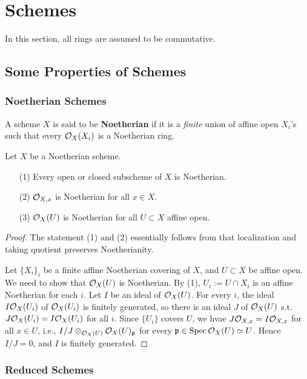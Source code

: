 \section{Schemes}
In this section, all rings are assumed to be commutative.

\subsection{Some Properties of Schemes}

\subsubsection{Noetherian Schemes}
A scheme $X$ is said to be \textbf{Noetherian} if it is a \textit{finite} union of affine open $X_i$'s such that every $\mathcal{O}_X(X_i)$ is a Noetherian ring.

\begin{proposition}
    Let $X$ be a Noetherian scheme.
\begin{enumerate}
\item [(1)] Every open or closed subscheme of $X$ is Noetherian.
\item [(2)] $\mathcal{O}_{X, x}$ is Noetherian for all $x\in X$.
\item [(3)] $\mathcal{O}_X(U)$ is Noetherian for all $U\subset X$ affine open.
\end{enumerate}
\end{proposition}
\begin{proof}
    The statement (1) and (2) essentially follows from that localization and taking quotient preserves Noetherianity.
    
    Let $\{X_i\}_i$ be a finite affine Noetherian covering of $X$, and $U\subset X$ be affine open. We need to show that $\mathcal{O}_X(U)$ is Noetherian.
    By (1), $U_i := U\cap X_i$ is an affine Noetherian for each $i$. Let $I$ be an ideal of $\mathcal{O}_X(U)$.
    For every $i$, the ideal $I\mathcal{O}_X(U_i)$ of $\mathcal{O}_X(U_i)$ is finitely generated,
    so there is an ideal $J$ of $\mathcal{O}_X(U)$ s.t. $J\mathcal{O}_X(U_i) = I\mathcal{O}_X(U_i)$ for all $i$.
    Since $\{U_i\}$ covers $U$,
    we hvae $J\mathcal{O}_{X, x} = I\mathcal{O}_{X, x}$ for all $x\in U$, i.e.,
    $I/J\otimes_{\mathcal{O}_X(U)} \mathcal{O}_X(U)_{\mathfrak{p}}$ for every $\mathfrak{p}\in\operatorname{Spec} \mathcal{O}_X(U) \simeq U$.
    Hence $I/J = 0$, and $I$ is finitely generated.
\end{proof}

\subsubsection{Reduced Schemes}

